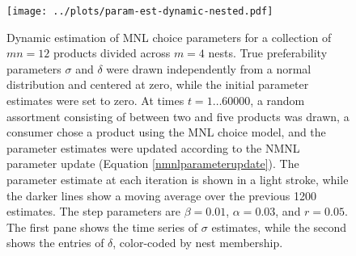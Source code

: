 \documentclass[preprint,12pt,authoryear]{elsarticle}
\begin{document}
\begin{figure}
\begin{center}\texttt{[image: ../plots/param-est-dynamic-nested.pdf]}\end{center}
\captionsetup{singlelinecheck=off}
    \caption[.]{Dynamic estimation of MNL choice parameters for a collection of $mn = 12$ products divided across $m=4$ nests. True preferability parameters $\sigma$ and $\delta$ were drawn independently from a normal distribution and centered at zero, while the initial parameter estimates were set to zero. At times $t = 1 \dots 60000$, a random assortment consisting of between two and five products was drawn, a consumer chose a product using the MNL choice model, and the parameter estimates were updated according to the NMNL parameter update (Equation \ref{nmnlparameterupdate}). The parameter estimate at each iteration is shown in a light stroke, while the darker lines show a moving average over the previous 1200 estimates. The step parameters are $\beta = 0.01$, $\alpha = 0.03$, and $r = 0.05$. The first pane shows the time series of $\sigma$ estimates, while the second shows the entries of $\delta$, color-coded by nest membership.}
\label{param-est-dynamic-nested}
\end{figure}
\end{document}

